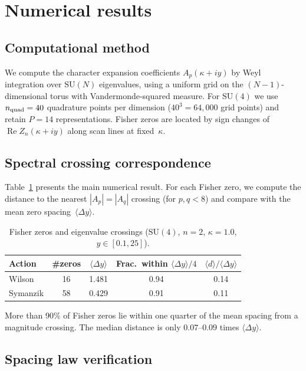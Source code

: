 \documentclass[12pt]{article}
\theoremstyle{definition}
\theoremstyle{remark}
\newcommand{\SU}{\mathrm{SU}}
\newcommand{\avg}[1]{\langle #1 \rangle}
\newcommand{\re}{\operatorname{Re}}
\begin{document}
\section{Numerical results}
\label{sec:numerics}

\subsection{Computational method}

We compute the character expansion coefficients $A_p(\kappa + iy)$ by
Weyl integration over $\SU(N)$ eigenvalues, using a uniform grid
on the $(N{-}1)$-dimensional torus with Vandermonde-squared measure.
For $\SU(4)$ we use $n_{\rm quad} = 40$ quadrature points per
dimension ($40^3 = 64{,}000$ grid points) and retain $P = 14$
representations.  Fisher zeros are located by sign changes of
$\re Z_n(\kappa + iy)$ along scan lines at fixed~$\kappa$.

\subsection{Spectral crossing correspondence}

Table~\ref{tab:crossing} presents the main numerical result.  For
each Fisher zero, we compute the distance to the nearest
$|A_p| = |A_q|$ crossing (for $p, q < 8$) and compare with the mean
zero spacing~$\avg{\Delta y}$.

\begin{table}[h]
\centering
\caption{Fisher zeros and eigenvalue crossings ($\SU(4)$,
  $n = 2$, $\kappa = 1.0$, $y \in [0.1, 25]$).}
\label{tab:crossing}
\begin{tabular}{lcccc}
\toprule
Action & \#zeros & $\avg{\Delta y}$ &
  Frac.\ within $\avg{\Delta y}/4$ &
  $\avg{d}/\avg{\Delta y}$ \\
\midrule
Wilson   & 16  & 1.481 & 0.94 & 0.14 \\
Symanzik & 58  & 0.429 & 0.91 & 0.11 \\
\bottomrule
\end{tabular}
\end{table}

More than 90\% of Fisher zeros lie within one quarter of the mean
spacing from a magnitude crossing.  The median distance is only
$0.07$--$0.09$ times $\avg{\Delta y}$.

\subsection{Spacing law verification}
\end{document}
